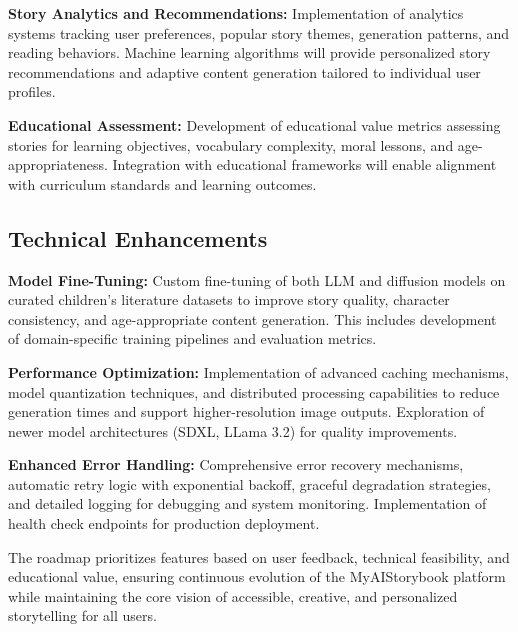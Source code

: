 \textbf{Story Analytics and Recommendations:} Implementation of analytics systems tracking user preferences, popular story themes, generation patterns, and reading behaviors. Machine learning algorithms will provide personalized story recommendations and adaptive content generation tailored to individual user profiles.

\textbf{Educational Assessment:} Development of educational value metrics assessing stories for learning objectives, vocabulary complexity, moral lessons, and age-appropriateness. Integration with educational frameworks will enable alignment with curriculum standards and learning outcomes.

\subsection{Technical Enhancements}

\textbf{Model Fine-Tuning:} Custom fine-tuning of both LLM and diffusion models on curated children's literature datasets to improve story quality, character consistency, and age-appropriate content generation. This includes development of domain-specific training pipelines and evaluation metrics.

\textbf{Performance Optimization:} Implementation of advanced caching mechanisms, model quantization techniques, and distributed processing capabilities to reduce generation times and support higher-resolution image outputs. Exploration of newer model architectures (SDXL, LLama 3.2) for quality improvements.

\textbf{Enhanced Error Handling:} Comprehensive error recovery mechanisms, automatic retry logic with exponential backoff, graceful degradation strategies, and detailed logging for debugging and system monitoring. Implementation of health check endpoints for production deployment.

The roadmap prioritizes features based on user feedback, technical feasibility, and educational value, ensuring continuous evolution of the MyAIStorybook platform while maintaining the core vision of accessible, creative, and personalized storytelling for all users.
